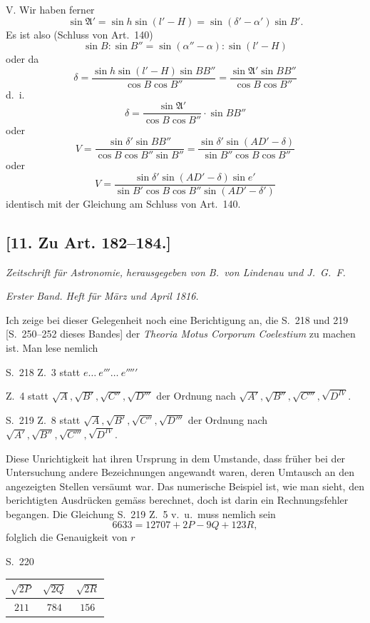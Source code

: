 \documentclass[12pt,a4paper]{article}
\begin{document}
V. Wir haben ferner
\[
\sin\mathfrak{A}' = \sin h \sin(l' - H) = \sin(\delta' - \alpha')\sin B'.
\]
Es ist also (Schluss von Art.~140)
\[
\sin B : \sin B'' = \sin(\alpha'' - \alpha) : \sin(l' - H)
\]
oder da
\[
\delta = \frac{\sin h \sin(l' - H) \sin BB''}{\cos B \cos B''} = \frac{\sin\mathfrak{A}' \sin BB''}{\cos B \cos B''}
\]
d.~i.
\[
\delta = \frac{\sin\mathfrak{A}'}{\cos B \cos B''} \cdot \sin BB''
\]
oder
\[
V = \frac{\sin\delta' \sin BB''}{\cos B \cos B'' \sin B''} = \frac{\sin\delta' \sin(AD' - \delta)}{\sin B'' \cos B \cos B''}
\]
oder
\[
V = \frac{\sin\delta' \sin(AD' - \delta) \sin e'}{\sin B' \cos B \cos B'' \sin(AD' - \delta')}
\]
identisch mit der Gleichung am Schluss von Art.~140.

\subsection*{[11. Zu Art. 182--184.]}

\textit{Zeitschrift f\"ur Astronomie, herausgegeben von B.~von Lindenau und J.~G.~F.}

\textit{Erster Band. Heft f\"ur M\"arz und April 1816.}

Ich zeige bei dieser Gelegenheit noch eine Berichtigung an, die S.~218
und 219 [S.~250--252 dieses Bandes] der \textit{Theoria Motus Corporum Coelestium}
zu machen ist. Man lese nemlich

S.~218 Z.~3 statt $e \ldots\ e''' \ldots\ e'''''$

Z.~4 statt $\sqrt{A}, \sqrt{B'}, \sqrt{C''}, \sqrt{D'''}$ der Ordnung nach $\sqrt{A'}, \sqrt{B''}, \sqrt{C'''}, \sqrt{D^{IV}}$.

S.~219 Z.~8 statt $\sqrt{A}, \sqrt{B'}, \sqrt{C''}, \sqrt{D'''}$ der Ordnung nach $\sqrt{A'}, \sqrt{B''}, \sqrt{C'''}, \sqrt{D^{IV}}$.

Diese Unrichtigkeit hat ihren Ursprung in dem Umstande, dass fr\"uher
bei der Untersuchung andere Bezeichnungen angewandt waren, deren Umtausch
an den angezeigten Stellen vers\"aumt war. Das numerische Beispiel ist, wie
man sieht, den berichtigten Ausdr\"ucken gem\"ass berechnet, doch ist darin ein
Rechnungsfehler begangen. Die Gleichung S.~219 Z.~5 v.~u.~muss nemlich sein
\[
6633 = 12707 + 2P - 9Q + 123R,
\]
folglich die Genauigkeit von $r$

\newpage

\begin{center}
S.~220
\end{center}

\begin{center}
\begin{tabular}{c|c|c}
$\sqrt{2P}$ & $\sqrt{2Q}$ & $\sqrt{2R}$ \\
\hline
$211$ & $784$ & $156$
\end{tabular}
\end{center}
\end{document}
